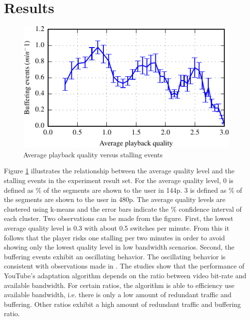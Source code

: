 
\section{Results}
\label{sec:results}

\begin{figure}[t]
\centering
\includegraphics[width=0.95\linewidth]{figs/33qualityvstalling}%
\caption{Average playback quality versus stalling events}
\label{fig:qualityvsstalling}%
\end{figure}

Figure \ref{fig:qualityvsstalling} illustrates the relationship between the average quality level and the stalling events in the experiment result set.
For the average quality level, 0 is defined as \unit[100]{\%} of the segments are shown to the user in 144p. 3 is defined as \unit[100]{\%} of the segments are shown to the user in 480p.
The average quality levels are clustered using k-means and the error bars indicate the \unit[95]{\%} confidence interval of each cluster.
Two observations can be made from the figure. 
First, the lowest average quality level is 0.3 with about 0.5 switches per minute.
From this it follows that the player risks one stalling per two minutes in order to avoid showing only the lowest quality level in low bandwidth scenarios.
Second, the buffering events exhibit an oscillating behavior.
The oscillating behavior is consistent with observations made in \cite{sieber16sacrificing, casas2012youtube}.
The studies show that the performance of YouTube's adaptation algorithm depends on the ratio between video bit-rate and available bandwidth.
For certain ratios, the algorithm is able to efficiency use available bandwidth, i.e. there is only a low amount of redundant traffic and buffering.
Other ratios exhibit a high amount of redundant traffic and buffering ratio.

